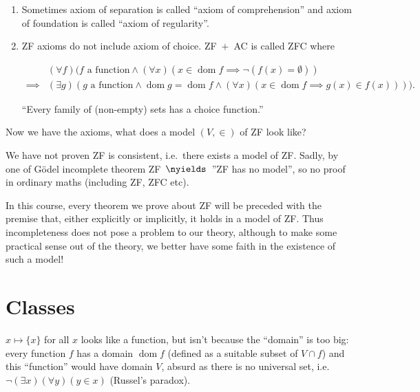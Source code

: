 \documentclass[a4paper]{article}
\DeclareMathOperator{\dom}{dom}%
\begin{document}
\begin{note}\leavevmode
  \begin{enumerate}
  \item Sometimes axiom of separation is called ``axiom of comprehension'' and axiom of foundation is called ``axiom of regularity''.
  \item ZF axioms do not include axiom of choice. ZF~\(+\)~AC is called ZFC where
    \begin{axiom*}
      \begin{align*}
        & (\forall f) (f \text{ a function} \land (\forall x) (x \in \dom f \implies \neg (f(x) = \emptyset)) \\
        \implies & (\exists g) (g \text{ a function} \land \dom g = \dom f \land (\forall x) (x \in \dom f \implies g(x) \in f(x)))).
      \end{align*}
    \end{axiom*}
    ``Every family of (non-empty) sets has a choice function.''
  \end{enumerate}
\end{note}

Now we have the axioms, what does a model \((V, \in)\) of ZF look like?

\begin{remark}
  We have not proven ZF is consistent, i.e.\ there exists a model of ZF. Sadly, by one of Gödel incomplete theorem ZF~\(\nyields\)~''ZF has no model'', so no proof in ordinary maths (including ZF, ZFC etc).
\end{remark}

In this course, every theorem we prove about ZF will be preceded with the premise that, either explicitly or implicitly, it holds in a model of ZF. Thus incompleteness does not pose a problem to our theory, although to make some practical sense out of the theory, we better have some faith in the existence of such a model!


\appendix

\section{Classes}
\label{sec:classes}

\(x \mapsto \{x\}\) for all \(x\) looks like a function, but isn't because the ``domain'' is too big: every function \(f\) has a domain \(\dom f\) (defined as a suitable subset of \(V \cap f\)) and this ``function'' would have domain \(V\), absurd as there is no universal set, i.e. \(\neg (\exists x) (\forall y) (y \in x)\) (Russel's paradox).
\end{document}
